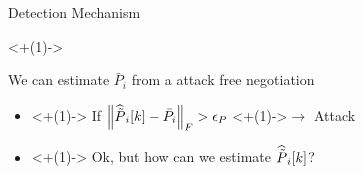 \documentclass[handout,aspectratio=169]{beamer}
\begin{document}
\begin{frame}{Detection Mechanism}

  \vspace{-.5cm}
  \onslide<+(1)->{
    \begin{assumption}
      We can estimate $\bar{P}_{i}$ from a attack free negotiation
    \end{assumption}
  }

  \begin{itemize}
    \item<+(1)-> If $\left\lVert\widehat{\tilde{P}}_{i}[k]-\bar{{P}}_{i}\right\rVert_{F}>\epsilon_{P}$ \onslide<+(1)->{$\to$ Attack}
    \item<+(1)-> Ok, but how can we estimate $\widehat{\tilde{P}}_{i}[k]$?
  \end{itemize}
\end{frame}
\end{document}
